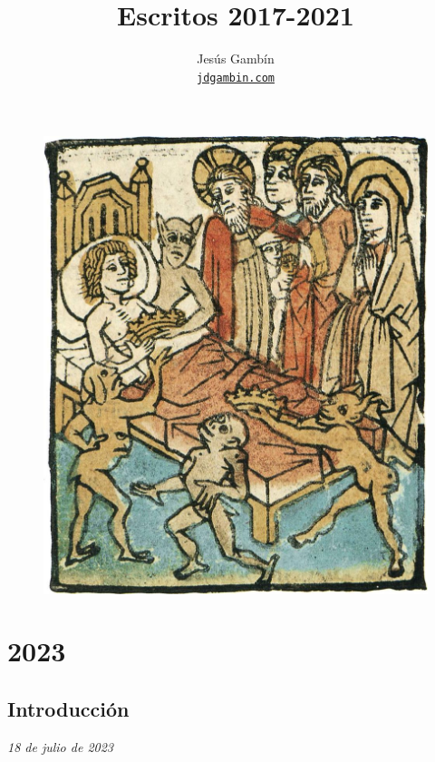 \documentclass[12pt]{article}
\title
{
	Escritos 2017-2021\\\vspace{0.5cm}
}
\author
{
	Jesús Gambín\\
	\normalsize{
		\texttt{\href{https://jdgambin.github.io}{jdgambin.com}}
	}
	\\\vspace{-1cm}
}
\date{}
\begin{document}
	\maketitle

	\begin{figure}[ht]
		\centering
		\includegraphics[scale=1]{portada}
	\end{figure}

	\vspace{0.8cm}

	\newpage

	\tableofcontents

	\newpage

	\section{2023}

	\subsection{Introducción}

	\textit{18 de julio de 2023}\\
\end{document}
